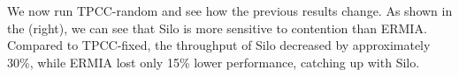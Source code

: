 We now run TPCC-random and see how the previous results change. As shown in the  (right), we can see that Silo is more sensitive to contention than ERMIA. Compared to TPCC-fixed, the throughput of Silo decreased by approximately 30\%, while ERMIA lost only 15\% lower performance, catching up with Silo.
%
